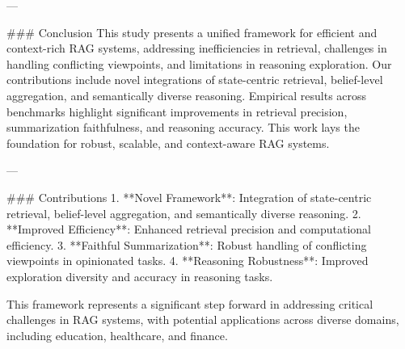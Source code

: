 ---

### Conclusion  
This study presents a unified framework for efficient and context-rich RAG systems, addressing inefficiencies in retrieval, challenges in handling conflicting viewpoints, and limitations in reasoning exploration. Our contributions include novel integrations of state-centric retrieval, belief-level aggregation, and semantically diverse reasoning. Empirical results across benchmarks highlight significant improvements in retrieval precision, summarization faithfulness, and reasoning accuracy. This work lays the foundation for robust, scalable, and context-aware RAG systems.  

---

### Contributions  
1. **Novel Framework**: Integration of state-centric retrieval, belief-level aggregation, and semantically diverse reasoning.  
2. **Improved Efficiency**: Enhanced retrieval precision and computational efficiency.  
3. **Faithful Summarization**: Robust handling of conflicting viewpoints in opinionated tasks.  
4. **Reasoning Robustness**: Improved exploration diversity and accuracy in reasoning tasks.  

This framework represents a significant step forward in addressing critical challenges in RAG systems, with potential applications across diverse domains, including education, healthcare, and finance.  
